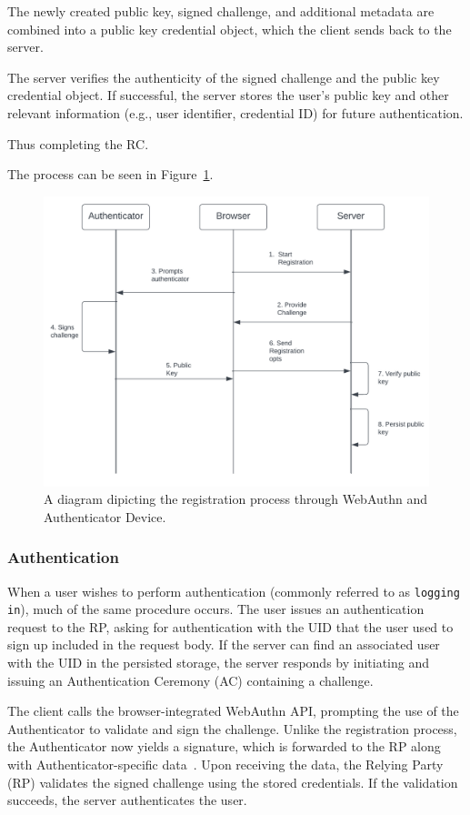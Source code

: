 The newly created public key, signed challenge, and additional metadata are combined into a public key credential object,
which the client sends back to the server.

The server verifies the authenticity of the signed challenge and the public key credential object.
If successful, the server stores the user's public key and other relevant information (e.g., user identifier, credential ID)
for future authentication.

Thus completing the RC\@.

The process can be seen in Figure~\ref{fig:registration}.
\begin{figure}[htbp]
  \centering
  \includegraphics[width=0.75\linewidth]{images/Registration}
  \caption{\footnotesize A diagram dipicting the registration process through WebAuthn and Authenticator Device.}
  \label{fig:registration}
\end{figure}

\subsubsection{Authentication}\label{subsubsec:authentication}
When a user wishes to perform authentication (commonly referred to as \texttt{logging in}), much of the same procedure
occurs.
The user issues an authentication request to the RP, asking for authentication
with the UID that the user used to sign up included in the request body.
If the server can find an associated user with the UID in the persisted storage,
the server responds by initiating and issuing an Authentication Ceremony (AC)
containing a challenge.

The client calls the browser-integrated WebAuthn API, prompting the use of the
Authenticator to validate and sign the challenge.
Unlike the registration process, the Authenticator now yields a signature, which is forwarded to the RP along with
Authenticator-specific data~\cite{webauthn_authenticator_data}.
Upon receiving the data, the Relying Party (RP) validates the signed challenge using the stored credentials.
If the validation succeeds, the server authenticates the user.

